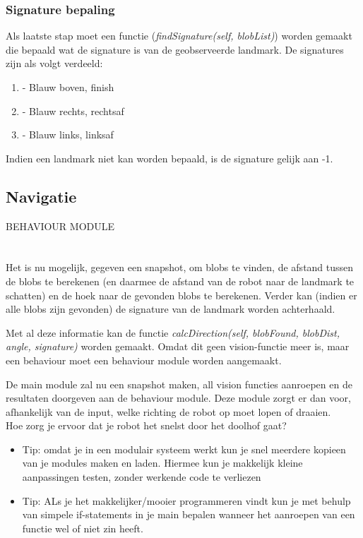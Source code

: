 \documentclass[a4paper, twoside]{article}
\begin{document}
\subsubsection{Signature bepaling}
Als laatste stap moet een functie (\textit{findSignature(self, blobList)}) worden gemaakt die bepaald wat de signature is van de geobserveerde landmark. De signatures zijn als volgt verdeeld:

\begin{enumerate}
\item - Blauw boven, finish
\item - Blauw rechts, rechtsaf
\item - Blauw links, linksaf
\end{enumerate}

Indien een landmark niet kan worden bepaald, is de signature gelijk aan -1.

\subsection{Navigatie}
BEHAVIOUR MODULE\\
\\
\\
Het is nu mogelijk, gegeven een snapshot, om blobs te vinden, de afstand tussen de blobs te berekenen (en daarmee de afstand van de robot naar de landmark te schatten) en de hoek naar de gevonden blobs te berekenen. Verder kan (indien er alle blobs zijn gevonden) de signature van de landmark worden achterhaald.

Met al deze informatie kan de functie \textit{calcDirection(self, blobFound, blobDist, angle, signature)} worden gemaakt. Omdat dit geen vision-functie meer is, maar een behaviour moet een behaviour module worden aangemaakt.

De main module zal nu een snapshot maken, all vision functies aanroepen en de resultaten doorgeven aan de behaviour module. Deze module zorgt er dan voor, afhankelijk van de input, welke richting de robot op moet lopen of draaien. 
\\

Hoe zorg je ervoor dat je robot het snelst door het doolhof gaat?

\begin{itemize}
\item Tip: omdat je in een modulair systeem werkt kun je snel meerdere kopieen van je modules maken en laden. Hiermee kun je makkelijk kleine aanpassingen testen, zonder werkende code te verliezen
\item Tip: ALs je het makkelijker/mooier programmeren vindt kun je met behulp van simpele if-statements in je main bepalen wanneer het aanroepen van een functie wel of niet zin heeft.
\end{itemize}
\end{document}

